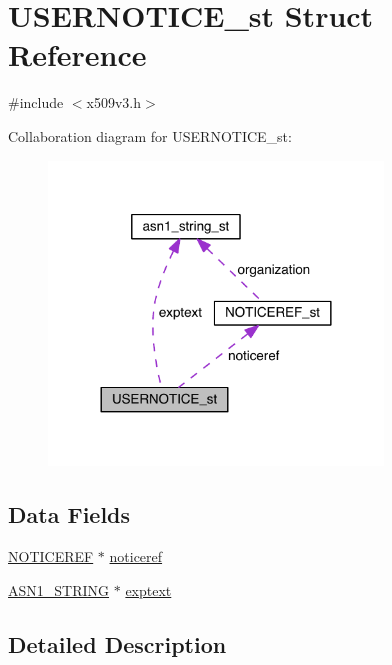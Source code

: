 \hypertarget{struct_u_s_e_r_n_o_t_i_c_e__st}{}\section{U\+S\+E\+R\+N\+O\+T\+I\+C\+E\+\_\+st Struct Reference}
\label{struct_u_s_e_r_n_o_t_i_c_e__st}


{\ttfamily \#include $<$x509v3.\+h$>$}



Collaboration diagram for U\+S\+E\+R\+N\+O\+T\+I\+C\+E\+\_\+st\+:\nopagebreak
\begin{figure}[H]
\begin{center}
\leavevmode
\includegraphics[width=252pt]{struct_u_s_e_r_n_o_t_i_c_e__st__coll__graph}
\end{center}
\end{figure}
\subsection*{Data Fields}
\begin{DoxyCompactItemize}
\item 
\hyperlink{crypto_2x509v3_2x509v3_8h_a085bbf8ec1c144ee91fe543ea1fdd21a}{N\+O\+T\+I\+C\+E\+R\+EF} $\ast$ \hyperlink{struct_u_s_e_r_n_o_t_i_c_e__st_ae2c146d24666664bcbb7e29641f8a7c7}{noticeref}
\item 
\hyperlink{crypto_2ossl__typ_8h_ad37610875e38aa6c59f5e6e0b437e65c}{A\+S\+N1\+\_\+\+S\+T\+R\+I\+NG} $\ast$ \hyperlink{struct_u_s_e_r_n_o_t_i_c_e__st_a6e05309358f492504592300c6d8afdb0}{exptext}
\end{DoxyCompactItemize}


\subsection{Detailed Description}


